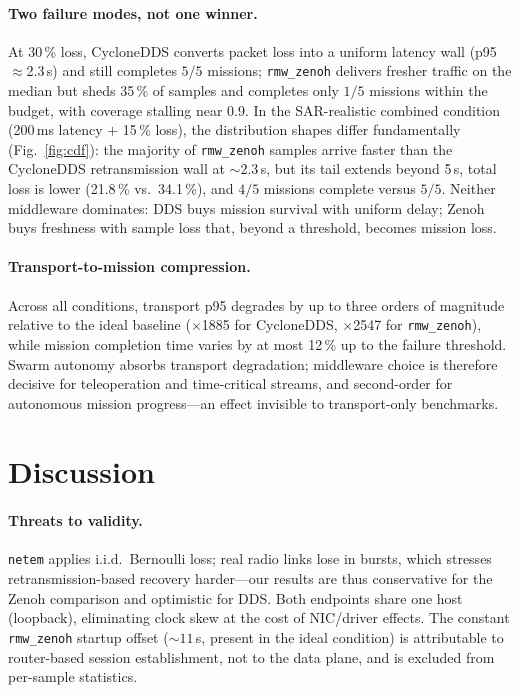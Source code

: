 \paragraph{Two failure modes, not one winner.}
At 30\,\% loss, CycloneDDS converts packet loss into a uniform latency wall
(p95 $\approx$2.3\,s) and still completes $5/5$ missions; \texttt{rmw\_zenoh}
delivers fresher traffic on the median but sheds 35\,\% of samples and
completes only $1/5$ missions within the budget, with coverage stalling near
0.9. In the SAR-realistic combined condition (200\,ms latency $+$ 15\,\%
loss), the distribution shapes differ fundamentally
(Fig.~\ref{fig:cdf}): the majority of \texttt{rmw\_zenoh} samples arrive
faster than the CycloneDDS retransmission wall at ${\sim}2.3$\,s, but its
tail extends beyond 5\,s, total loss is lower (21.8\,\% vs.\ 34.1\,\%), and
$4/5$ missions complete versus $5/5$. Neither middleware dominates: DDS
buys mission survival with uniform delay; Zenoh buys freshness with sample
loss that, beyond a threshold, becomes mission loss.

\paragraph{Transport-to-mission compression.}
Across all conditions, transport p95 degrades by up to three orders of
magnitude relative to the ideal baseline ($\times$1885 for CycloneDDS,
$\times$2547 for \texttt{rmw\_zenoh}), while mission completion time varies
by at most 12\,\% up to the failure threshold. Swarm autonomy absorbs
transport degradation; middleware choice is therefore decisive for
teleoperation and time-critical streams, and second-order for autonomous
mission progress---an effect invisible to transport-only benchmarks.

\section{Discussion}
\label{sec:discussion}

\paragraph{Threats to validity.}
\texttt{netem} applies i.i.d.\ Bernoulli loss; real radio links lose in
bursts, which stresses retransmission-based recovery harder---our results
are thus conservative for the Zenoh comparison and optimistic for DDS.
Both endpoints share one host (loopback), eliminating clock skew at the cost
of NIC/driver effects. The constant \texttt{rmw\_zenoh} startup offset
(${\sim}11$\,s, present in the ideal condition) is attributable to
router-based session establishment, not to the data plane, and is excluded
from per-sample statistics.
